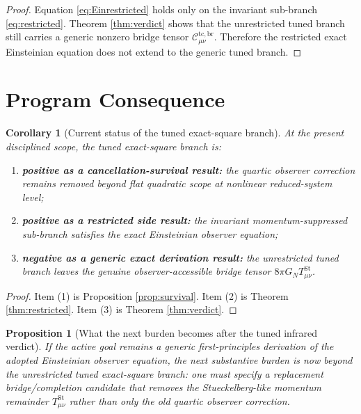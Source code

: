 \documentclass[11pt]{article}
\newtheorem{proposition}{Proposition}
\newtheorem{corollary}{Corollary}
\begin{document}
\begin{proof}
Equation \eqref{eq:Einrestricted} holds only on the invariant sub-branch \eqref{eq:restricted}. Theorem \ref{thm:verdict} shows that the unrestricted tuned branch still carries a generic nonzero bridge tensor \( \mathcal C_{\mu\nu}^{\mathrm{tc,br}} \). Therefore the restricted exact Einsteinian equation does not extend to the generic tuned branch.
\end{proof}

\section{Program Consequence}

\begin{corollary}[Current status of the tuned exact-square branch]
\label{cor:status}
At the present disciplined scope, the tuned exact-square branch is:
\begin{enumerate}
    \item \textbf{positive as a cancellation-survival result:} the quartic observer correction remains removed beyond flat quadratic scope at nonlinear reduced-system level;
    \item \textbf{positive as a restricted side result:} the invariant momentum-suppressed sub-branch satisfies the exact Einsteinian observer equation;
    \item \textbf{negative as a generic exact derivation result:} the unrestricted tuned branch leaves the genuine observer-accessible bridge tensor \(8\pi G_N T_{\mu\nu}^{\mathrm{St}}\).
\end{enumerate}
\end{corollary}

\begin{proof}
Item (1) is Proposition \ref{prop:survival}. Item (2) is Theorem \ref{thm:restricted}. Item (3) is Theorem \ref{thm:verdict}.
\end{proof}

\begin{proposition}[What the next burden becomes after the tuned infrared verdict]
\label{prop:next}
If the active goal remains a generic first-principles derivation of the adopted Einsteinian observer equation, the next substantive burden is now beyond the unrestricted tuned exact-square branch: one must specify a replacement bridge/completion candidate that removes the Stueckelberg-like momentum remainder \(T_{\mu\nu}^{\mathrm{St}}\) rather than only the old quartic observer correction.
\end{proposition}
\end{document}
